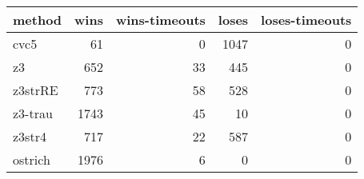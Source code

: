 \begin{tabular}{lrrrr}
\hline
 method   &   wins &   wins-timeouts &   loses &   loses-timeouts \\
\hline
 cvc5     &     61 &               0 &    1047 &                0 \\
 z3       &    652 &              33 &     445 &                0 \\
 z3strRE  &    773 &              58 &     528 &                0 \\
 z3-trau  &   1743 &              45 &      10 &                0 \\
 z3str4   &    717 &              22 &     587 &                0 \\
 ostrich  &   1976 &               6 &       0 &                0 \\
\hline
\end{tabular}
